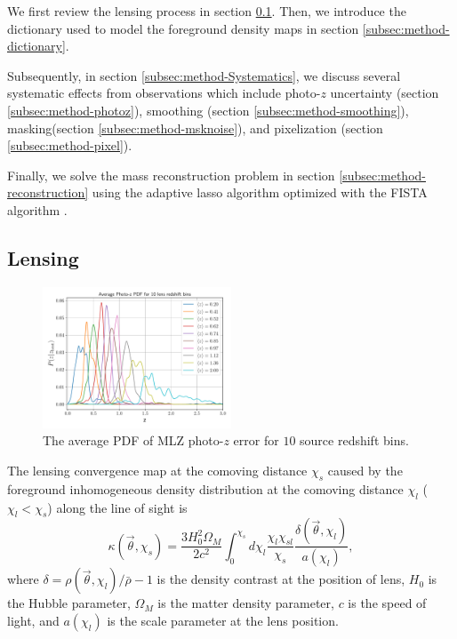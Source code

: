 \documentclass[twocolumn]{aastex62}
\begin{document}
We first review the lensing process in section \ref{subsec:method-delta2shear}.
Then, we introduce the dictionary used to model the foreground density maps in
section \ref{subsec:method-dictionary}.

Subsequently, in section \ref{subsec:method-Systematics}, we discuss several
systematic effects from observations which include photo-$z$ uncertainty
(section \ref{subsec:method-photoz}), smoothing (section
\ref{subsec:method-smoothing}), masking(section \ref{subsec:method-msknoise}),
and pixelization (section \ref{subsec:method-pixel}).

Finally, we solve the mass reconstruction problem in section
\ref{subsec:method-reconstruction} using the adaptive lasso algorithm
\citep{AdaLASSO-Zou2006} optimized with the FISTA algorithm
\citep{FISTA-Beck2009}.


\subsection{Lensing}
\label{subsec:method-delta2shear}

\begin{figure}[!t]
 \centering
 \includegraphics[width=0.5\textwidth]{mlz-poz.pdf}
 \caption{The average PDF of MLZ photo-$z$ error for $10$ source redshift bins.
        }\label{fig_pdfpz}
\end{figure}

The lensing convergence map at the comoving distance $\chi_s$ caused by the
foreground inhomogeneous density distribution at the comoving distance $\chi_l$
($\chi_l< \chi_s$) along the line of sight is
\begin{equation}
\kappa(\vec{\theta},\chi_s)=\frac{3H_0^2\Omega_M}{2 c^2} \int_0^{\chi_s} d\chi_l \frac{\chi_l \chi_{sl}}{\chi_s}
\frac{\delta(\vec{\theta},\chi_l)}{a(\chi_l)},
\end{equation}
where $\delta=\rho(\vec{\theta},\chi_l)/\bar{\rho}-1$ is the density contrast
at the position of lens, $H_0$ is the Hubble parameter, $\Omega_M$ is the
matter density parameter, $c$ is the speed of light, and $a(\chi_l)$ is the
scale parameter at the lens position.
\end{document}
